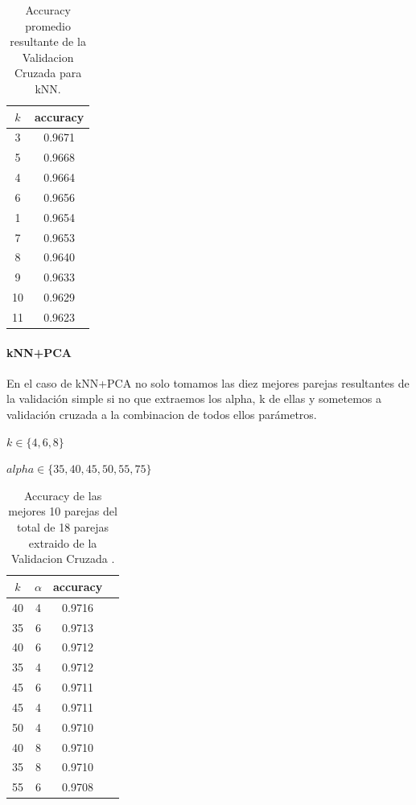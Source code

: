 \begin{table}[h!]
    \begin{center}
        \begin{tabular}{|c|c|}
        \hline
        \textbf{$k$} & \textbf{accuracy} \\
        \hline
        3 &  0.9671\\
        5 & 0.9668\\
        4 & 0.9664\\
        6 & 0.9656\\
        1 &  0.9654\\
        7 & 0.9653\\
        8 & 0.9640\\
        9 & 0.9633\\
        10 & 0.9629\\
        11 & 0.9623\\
        
        \hline
        \end{tabular}
        \caption{Accuracy promedio resultante de la Validacion Cruzada para kNN.}
        \label{knn_crossVal_table}
    \end{center}
\end{table}

\paragraph{kNN+PCA}

En el caso de kNN+PCA  no solo tomamos las diez mejores parejas resultantes de la validación simple si no que extraemos los alpha, k de ellas y sometemos a validación cruzada a la combinacion de todos ellos parámetros.

$ k \in \{4,6,8\}$
\par
$alpha \in \{  35, 40, 45, 50, 55, 75 \}$
\begin{table}[h!]
    \begin{center}
        \begin{tabular}{|c|c|c|c|}
        \hline
        \textbf{$k$} & \textbf{$\alpha$} & \textbf{accuracy} \\
        \hline
        40 & 4 & 0.9716\\
        35 & 6 & 0.9713\\
        40 & 6 & 0.9712\\
        35 & 4 & 0.9712\\
        45 & 6 & 0.9711\\
        45 & 4 & 0.9711\\
        50 & 4 & 0.9710\\
        40 & 8 & 0.9710\\
        35 & 8 & 0.9710\\
        55 & 6 & 0.9708\\
        
        \hline
        \end{tabular}
        \caption{Accuracy de las mejores 10 parejas del total de 18 parejas extraido de la Validacion Cruzada .}
        \label{knnpca_crossVal_table}

    \end{center}
\end{table}

